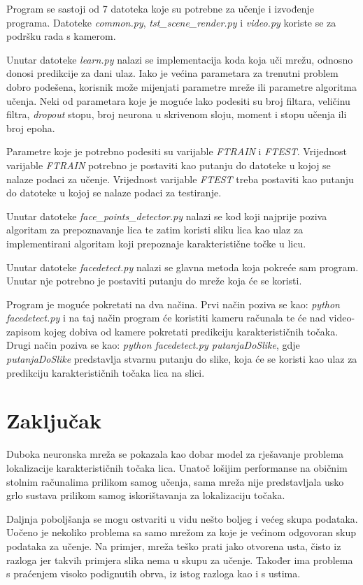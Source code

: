 \documentclass[times, utf8, zavrsni, numeric]{fer}
\begin{document}
Program se sastoji od 7 datoteka koje su potrebne za učenje i izvođenje programa.
Datoteke \emph{common.py}, \emph{tst\_scene\_render.py} i \emph{video.py} koriste se za podršku rada s kamerom.

Unutar datoteke \emph{learn.py} nalazi se implementacija koda koja uči mrežu, odnosno donosi predikcije za dani ulaz. Iako je većina parametara za trenutni problem dobro podešena, korisnik može mijenjati parametre mreže ili parametre algoritma učenja. Neki od parametara koje je moguće lako podesiti su broj filtara, veličinu filtra, \textit{dropout} stopu, broj neurona u skrivenom sloju, moment i stopu učenja ili broj epoha.

Parametre koje je potrebno podesiti su varijable \emph{FTRAIN} i \emph{FTEST}. Vrijednost varijable \emph{FTRAIN} potrebno je postaviti kao putanju do datoteke u kojoj se nalaze podaci za učenje. Vrijednost varijable \emph{FTEST} treba postaviti kao putanju do datoteke u kojoj se nalaze podaci za testiranje.

Unutar datoteke \emph{face\_points\_detector.py} nalazi se kod koji najprije poziva algoritam za prepoznavanje lica te zatim koristi sliku lica kao ulaz za implementirani algoritam koji prepoznaje karakteristične točke u licu.

Unutar datoteke \emph{facedetect.py} nalazi se glavna metoda koja pokreće sam program. Unutar nje potrebno je postaviti putanju do mreže koja će se koristi.

Program je moguće pokretati na dva načina. Prvi način poziva se kao: \emph{python facedetect.py} i na taj način program će koristiti kameru računala te će nad video-zapisom kojeg dobiva od kamere pokretati predikciju karakterističnih točaka. Drugi način poziva se kao: \emph{python facedetect.py putanjaDoSlike}, gdje \emph{putanjaDoSlike} predstavlja stvarnu putanju do slike, koja će se koristi kao ulaz za predikciju karakterističnih točaka lica na slici.

\chapter{Zaključak}

Duboka neuronska mreža se pokazala kao dobar model za rješavanje problema lokalizacije karakterističnih točaka lica. Unatoč lošijim performanse na običnim stolnim računalima prilikom samog učenja, sama mreža nije predstavljala usko grlo sustava prilikom samog iskorištavanja za lokalizaciju točaka.

Daljnja poboljšanja se mogu ostvariti u vidu nešto boljeg i većeg skupa podataka. Uočeno je nekoliko problema sa samo mrežom za koje je većinom odgovoran skup podataka za učenje. Na primjer, mreža teško prati jako otvorena usta, čisto iz razloga jer takvih primjera slika nema u skupu za učenje. Također ima problema s praćenjem visoko podignutih obrva, iz istog razloga kao i s ustima.
\end{document}
